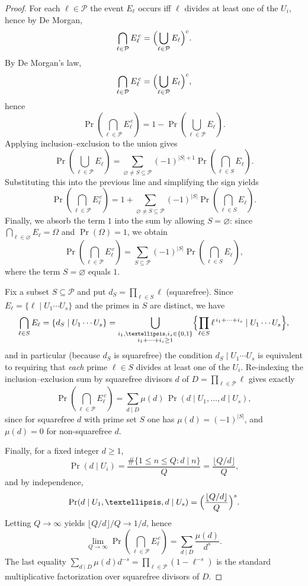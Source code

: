 \documentclass[10pt,a4paper]{amsart}
\begin{document}
\begin{proof}
For each $\ell\in\mathcal{P}$ the event $E_\ell$ occurs iff $\ell$ divides at least one of the
$U_i$, hence by De Morgan,
\[
\bigcap_{\ell\in\mathcal{P}}E_\ell^{\,c}
=\Bigl(\bigcup_{\ell\in\mathcal{P}}E_\ell\Bigr)^{c}.
\]
By De Morgan's law,
\[
\bigcap_{\ell\in\mathcal{P}}E_\ell^{\,c}
=\Bigl(\bigcup_{\ell\in\mathcal{P}}E_\ell\Bigr)^{c},
\]
hence
\[
\Pr\!\left(\bigcap_{\ell\in\mathcal{P}}E_\ell^{\,c}\right)
=1-\Pr\!\left(\bigcup_{\ell\in\mathcal{P}}E_\ell\right).
\]
Applying inclusion--exclusion to the union gives
\[
\Pr\!\left(\bigcup_{\ell\in\mathcal{P}}E_\ell\right)
=\sum_{\varnothing\neq S\subseteq \mathcal{P}}(-1)^{|S|+1}
\Pr\!\left(\bigcap_{\ell\in S} E_\ell\right).
\]
Substituting this into the previous line and simplifying the sign yields
\[
\Pr\!\left(\bigcap_{\ell\in\mathcal{P}}E_\ell^{\,c}\right)
=1+\sum_{\varnothing\neq S\subseteq \mathcal{P}}(-1)^{|S|}
\Pr\!\left(\bigcap_{\ell\in S} E_\ell\right).
\]
Finally, we absorb the term \(1\) into the sum by allowing \(S=\varnothing\):
since \(\bigcap_{\ell\in\varnothing}E_\ell=\Omega\) and \(\Pr(\Omega)=1\), we obtain
\[
\Pr\!\left(\bigcap_{\ell\in\mathcal{P}}E_\ell^{\,c}\right)
=\sum_{S\subseteq \mathcal{P}}(-1)^{|S|}
\Pr\!\left(\bigcap_{\ell\in S} E_\ell\right),
\]
where the term \(S=\varnothing\) equals \(1\).

Fix a subset $S\subseteq\mathcal{P}$ and put $d_S=\prod_{\ell\in S}\ell$ (squarefree). Since
$E_\ell=\{\ell\mid U_1\cdots U_s\}$ and the primes in $S$ are distinct, we have
\[
\bigcap_{\ell\in S} E_\ell
=\{d_S \mid U_1\cdots U_s\}
=\bigcup_{\substack{i_1,\dots,i_s\in\{0,1\}\\ i_1+\cdots+i_s\ge 1}}
\Bigl\{\prod_{\ell\in S}\ell^{\,i_1+\cdots+i_s}\mid U_1\cdots U_s\Bigr\},
\]
and in particular (because $d_S$ is squarefree) the condition $d_S\mid U_1\cdots U_s$ is
equivalent to requiring that \emph{each} prime $\ell\in S$ divides at least one of the $U_i$.
Re-indexing the inclusion--exclusion sum by squarefree divisors $d$ of
$D=\prod_{\ell\in\mathcal{P}}\ell$ gives exactly
\[
\Pr\!\left(\bigcap_{\ell\in\mathcal{P}} E_\ell^{\,c}\right)
=\sum_{d\mid D}\mu(d)\,\Pr(d\mid U_1,\dots,d\mid U_s),
\]
since for squarefree $d$ with prime set $S$ one has $\mu(d)=(-1)^{|S|}$, and $\mu(d)=0$ for
non-squarefree $d$.

Finally, for a fixed integer $d\ge 1$,
\[
\Pr(d\mid U_i)=\frac{\#\{1\le n\le Q: d\mid n\}}{Q}=\frac{\lfloor Q/d\rfloor}{Q},
\]
and by independence,
\[
\Pr(d\mid U_1,\dots,d\mid U_s)=\Bigl(\frac{\lfloor Q/d\rfloor}{Q}\Bigr)^s.
\]
Letting $Q\to\infty$ yields $\lfloor Q/d\rfloor/Q\to 1/d$, hence
\[
\lim_{Q\to\infty}\Pr\!\left(\bigcap_{\ell\in\mathcal{P}} E_\ell^{\,c}\right)
=\sum_{d\mid D}\frac{\mu(d)}{d^s}.
\]
The last equality
\(
\sum_{d\mid D}\mu(d)d^{-s}=\prod_{\ell\in\mathcal{P}}(1-\ell^{-s})
\)
is the standard multiplicative factorization over squarefree divisors of $D$.
\end{proof}
\end{document}
